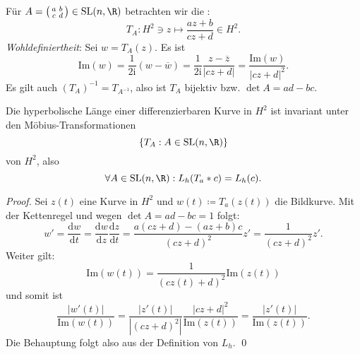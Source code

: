 \begin{definition}
  Für \( A = \left( \begin{smallmatrix}
    a & b \\ c & d
  \end{smallmatrix} \right) \in \text{SL}(n,\R) \) betrachten wir die :
  \begin{equation*}
    T_A: H^2 \ni z \mapsto \frac{az + b}{cz + d} \in H^2\text{.}
  \end{equation*}
  \emph{Wohldefiniertheit}: Sei \( w = T_A(z) \). Es ist
  \begin{equation*}
    \text{Im}(w) = \frac{1}{2\text{i}}(w-\overline{w}) = \frac{1}{2\text{i}} \frac{z - \overline{z}}{\left\vert cz + d \right\vert} = \frac{\text{Im}(w)}{\left\vert cz + d \right\vert^2}\text{.}
  \end{equation*}
  Es gilt auch \( {(T_A)}^{-1} = T_{A^{-1}} \), also ist \( T_A \) bijektiv bzw. \( \det A = ad - bc \).
\end{definition}

\begin{lemma}
  Die hyperbolische Länge einer differenzierbaren Kurve in \( H^2 \) ist invariant unter den Möbius-Transformationen
  \begin{equation*}
    \left \{ T_A : A \in \text{SL}(n,\R) \right \}
  \end{equation*}
  von \( H^2 \), also
  \begin{equation*}
    \forall A \in \text{SL}(n,\R) : L_h(T_a * c) = L_h(c)\text{.}
  \end{equation*}
  \begin{proof}
    Sei \( z(t) \) eine Kurve in \( H^2 \) und \( w(t) \coloneqq T_a(z(t)) \) die Bildkurve. Mit der Kettenregel und wegen \( \det A = ad - bc = 1 \) folgt:
    \begin{equation*}
      w' = \frac{\text{d}w}{\text{d}t} = \frac{\text{d}w}{\text{d}z} \frac{\text{d}z}{\text{d}t} = \frac{a(cz + d) - (az + b)c}{{(cz + d)}^2}z' = \frac{1}{{(cz + d)}^2}z' \text{.}
    \end{equation*}
    Weiter gilt:
    \begin{equation*}
      \text{Im}(w(t)) = \frac{1}{{(cz(t) + d)}^2}\text{Im}(z(t))
    \end{equation*}
    und somit ist
    \begin{equation*}
      \frac{\left\vert w'(t) \right\vert}{\text{Im}(w(t))} = \frac{\left\vert z'(t) \right\vert}{\left\vert {(cz + d)}^2 \right\vert} \frac{\left\vert cz + d \right\vert^2}{\text{Im}(z(t))} = \frac{\left\vert z'(t) \right\vert}{\text{Im}(z(t))}\text{.}
    \end{equation*}
    Die Behauptung folgt also aus der Definition von \( L_h \). \qed{}
  \end{proof}
\end{lemma}

